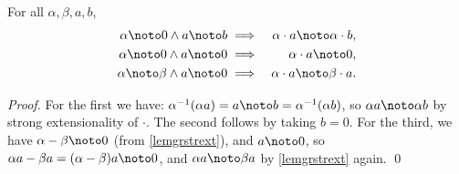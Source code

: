 \begin{lemma} For all $\alpha,\beta,a,b$,
\begin{eqnarray*}
\alpha\noto 0\wedge a\noto b&\implies & \alpha\cdot a \noto \alpha\cdot b,\\
\alpha\noto 0\wedge a\noto 0&\implies & \alpha\cdot a \noto 0,\\
\alpha\noto \beta\wedge a\noto 0&\implies & \alpha\cdot a \noto \beta\cdot a.
\end{eqnarray*}
\end{lemma}
\begin{proof}
For the first we have: $\alpha^{-1}(\alpha a)=a\noto
b=\alpha^{-1}(\alpha b)$, so $\alpha a \noto\alpha b$ by strong
extensionality of $\cdot$.  The second follows by taking $b=0$.  For
the third, we have $\alpha-\beta\noto 0$ (from \ref{lemgrstrext}), and
$a\noto 0$, so $\alpha a-\beta a=(\alpha-\beta)a\noto 0$, and $\alpha
a\noto\beta a$ by \ref{lemgrstrext} again. \qed
\end{proof}

